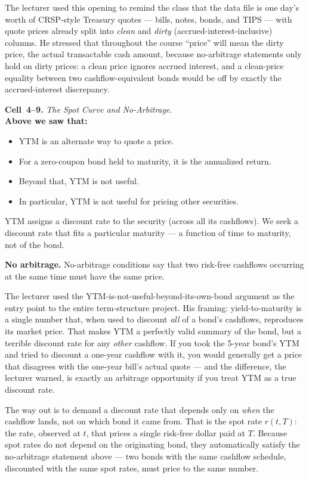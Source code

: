 The lecturer used this opening to remind the class that the data file is one
day's worth of CRSP-style Treasury quotes --- bills, notes, bonds, and TIPS
--- with quote prices already split into \emph{clean} and \emph{dirty}
(accrued-interest-inclusive) columns. He stressed that throughout the course
``price'' will mean the dirty price, the actual transactable cash amount,
because no-arbitrage statements only hold on dirty prices: a clean price
ignores accrued interest, and a clean-price equality between two cashflow-equivalent
bonds would be off by exactly the accrued-interest discrepancy.

\begin{keyblock}
\textbf{Cell~4--9.} \emph{The Spot Curve and No-Arbitrage.}\\
\textbf{Above we saw that:}
\begin{itemize}
  \item YTM is an alternate way to quote a price.
  \item For a zero-coupon bond held to maturity, it is the annualized return.
  \item Beyond that, YTM is not useful.
  \item In particular, YTM is not useful for pricing other securities.
\end{itemize}
YTM assigns a discount rate to the security (across all its cashflows). We
seek a discount rate that fits a particular maturity --- a function of time
to maturity, not of the bond.

\textbf{No arbitrage.} No-arbitrage conditions say that two risk-free cashflows
occurring at the same time must have the same price.
\end{keyblock}

The lecturer used the YTM-is-not-useful-beyond-its-own-bond argument as the
entry point to the entire term-structure project. His framing: yield-to-maturity
is a single number that, when used to discount \emph{all} of a bond's cashflows,
reproduces its market price. That makes YTM a perfectly valid summary of the
bond, but a terrible discount rate for any \emph{other} cashflow. If you took
the 5-year bond's YTM and tried to discount a one-year cashflow with it, you
would generally get a price that disagrees with the one-year bill's actual
quote --- and the difference, the lecturer warned, is exactly an arbitrage
opportunity if you treat YTM as a true discount rate.

The way out is to demand a discount rate that depends only on \emph{when} the
cashflow lands, not on which bond it came from. That is the spot rate $r(t,T)$:
the rate, observed at $t$, that prices a single risk-free dollar paid at $T$.
Because spot rates do not depend on the originating bond, they automatically
satisfy the no-arbitrage statement above --- two bonds with the same cashflow
schedule, discounted with the same spot rates, must price to the same number.

